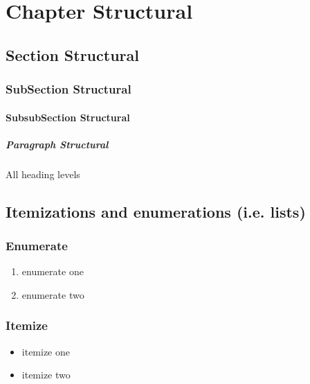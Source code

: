 \chapter{Chapter Structural}
\section{Section Structural}
\subsection{SubSection Structural}
\subsubsection{SubsubSection Structural}
\paragraph{Paragraph Structural}
All heading levels 

\section{Itemizations and enumerations (i.e. lists)}
\subsection{Enumerate}
\begin{enumerate}
\item enumerate one
\item enumerate two
\end{enumerate}

\subsection{Itemize}
\begin{itemize}
\item itemize one
\item itemize two
\end{itemize}

